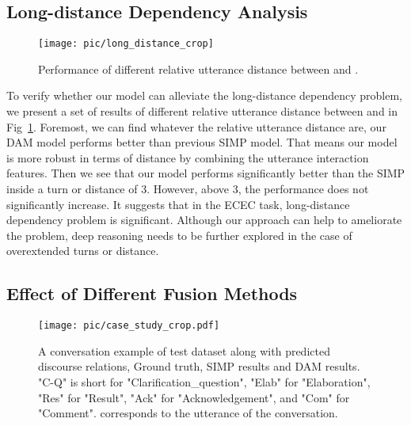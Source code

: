 \documentclass[11pt]{article}
\begin{document}
\subsection{Long-distance Dependency Analysis}

\begin{figure}[t]
    \centering
\texttt{[image: pic/long\_distance\_crop]}
    \caption{Performance of different relative utterance distance between  and .} 
    \label{fig3}
\end{figure}

To verify whether our model can alleviate the long-distance dependency problem, we present a set of results of different relative utterance distance between  and  in Fig~\ref{fig3}.
Foremost, we can find whatever the relative utterance distance are, our DAM model performs better than previous SIMP model.
That means our model is more robust in terms of distance by combining the utterance interaction features.
Then we see that our model performs significantly better than the SIMP inside a turn or distance of 3.
However, above 3, the performance does not significantly increase.
It suggests that in the ECEC task, long-distance dependency problem is significant.
Although our approach can help to ameliorate the problem, deep reasoning needs to be further explored in the case of overextended turns or distance.

\subsection{Effect of Different Fusion Methods}
\begin{figure*}
    \centering
    \texttt{[image: pic/case\_study\_crop.pdf]}
    \caption{A conversation example of test dataset along with predicted discourse relations, Ground truth, SIMP results and DAM results. 
    "C-Q" is short for "Clarification\_question", "Elab" for "Elaboration", "Res" for "Result", "Ack" for "Acknowledgement", and "Com" for "Comment". 
     corresponds to the  utterance of the conversation.} 
    \label{fig4}
\end{figure*}
\end{document}

